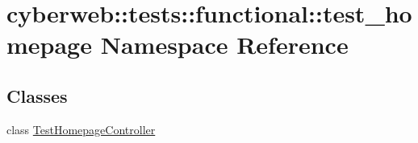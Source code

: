 \hypertarget{namespacecyberweb_1_1tests_1_1functional_1_1test__homepage}{\section{cyberweb\-:\-:tests\-:\-:functional\-:\-:test\-\_\-homepage \-Namespace \-Reference}
\label{namespacecyberweb_1_1tests_1_1functional_1_1test__homepage}
}
\subsection*{\-Classes}
\begin{DoxyCompactItemize}
\item 
class \hyperlink{classcyberweb_1_1tests_1_1functional_1_1test__homepage_1_1_test_homepage_controller}{\-Test\-Homepage\-Controller}
\end{DoxyCompactItemize}
